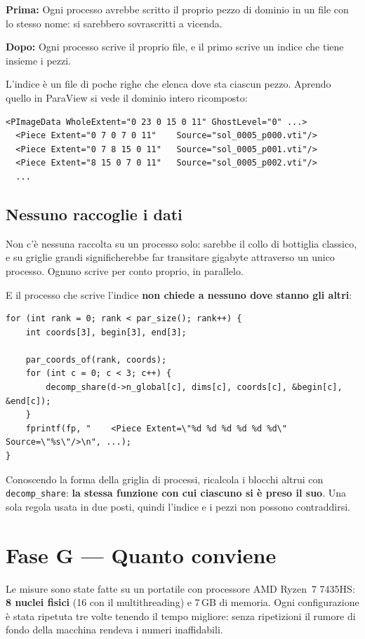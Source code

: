 \documentclass[11pt,a4paper]{article}
\newcommand{\prima}[1]{\par\smallskip\noindent\textbf{\color{scuro}Prima:} #1\par}
\newcommand{\dopo}[1]{\par\smallskip\noindent\textbf{\color{scuro}Dopo:} #1\par\smallskip}
\newcommand{\cd}[1]{\texttt{\small #1}}
\begin{document}
\prima{Ogni processo avrebbe scritto il proprio pezzo di dominio in un file con
lo stesso nome: si sarebbero sovrascritti a vicenda.}

\dopo{Ogni processo scrive il proprio file, e il primo scrive un indice che
tiene insieme i pezzi.}

L'indice è un file di poche righe che elenca dove sta ciascun pezzo. Aprendo
quello in ParaView si vede il dominio intero ricomposto:

\begin{lstlisting}
<PImageData WholeExtent="0 23 0 15 0 11" GhostLevel="0" ...>
  <Piece Extent="0 7 0 7 0 11"    Source="sol_0005_p000.vti"/>
  <Piece Extent="0 7 8 15 0 11"   Source="sol_0005_p001.vti"/>
  <Piece Extent="8 15 0 7 0 11"   Source="sol_0005_p002.vti"/>
  ...
\end{lstlisting}

\subsection*{Nessuno raccoglie i dati}

Non c'è nessuna raccolta su un processo solo: sarebbe il collo di bottiglia
classico, e su griglie grandi significherebbe far transitare gigabyte
attraverso un unico processo. Ognuno scrive per conto proprio, in parallelo.

E il processo che scrive l'indice \textbf{non chiede a nessuno dove stanno gli
altri}:

\begin{lstlisting}
for (int rank = 0; rank < par_size(); rank++) {
    int coords[3], begin[3], end[3];

    par_coords_of(rank, coords);
    for (int c = 0; c < 3; c++) {
        decomp_share(d->n_global[c], dims[c], coords[c], &begin[c], &end[c]);
    }
    fprintf(fp, "    <Piece Extent=\"%d %d %d %d %d %d\" Source=\"%s\"/>\n", ...);
}
\end{lstlisting}

Conoscendo la forma della griglia di processi, ricalcola i blocchi altrui con
\cd{decomp\_share}: \textbf{la stessa funzione con cui ciascuno si è preso il
suo}. Una sola regola usata in due posti, quindi l'indice e i pezzi non possono
contraddirsi.

\section{Fase G --- Quanto conviene}

Le misure sono state fatte su un portatile con processore AMD Ryzen~7 7435HS:
\textbf{8 nuclei fisici} (16 con il multithreading) e 7\,GB di memoria. Ogni
configurazione è stata ripetuta tre volte tenendo il tempo migliore: senza
ripetizioni il rumore di fondo della macchina rendeva i numeri inaffidabili.
\end{document}
